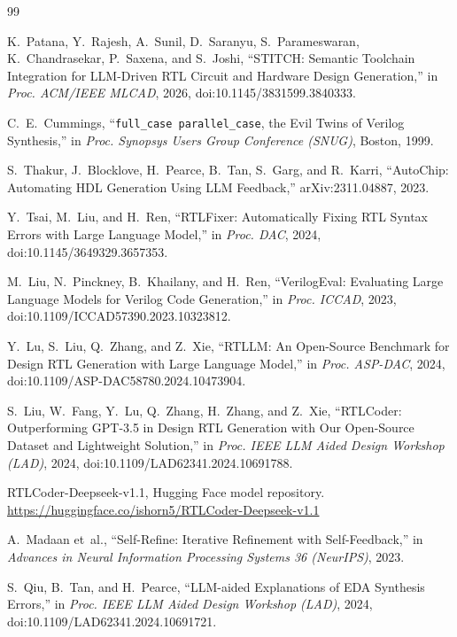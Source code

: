 \documentclass[11pt]{article}
\begin{document}
\begin{thebibliography}{99}
\footnotesize
\setlength{\itemsep}{0pt}

K.~Patana, Y.~Rajesh, A.~Sunil, D.~Saranyu, S.~Parameswaran, K.~Chandrasekar,
P.~Saxena, and S.~Joshi, ``STITCH: Semantic Toolchain Integration for
LLM-Driven RTL Circuit and Hardware Design Generation,'' in \emph{Proc. ACM/IEEE
MLCAD}, 2026, doi:10.1145/3831599.3840333.

C.~E.~Cummings, ``\texttt{full\_case parallel\_case}, the Evil Twins of Verilog
Synthesis,'' in \emph{Proc. Synopsys Users Group Conference (SNUG)}, Boston,
1999.

S.~Thakur, J.~Blocklove, H.~Pearce, B.~Tan, S.~Garg, and R.~Karri, ``AutoChip:
Automating HDL Generation Using LLM Feedback,'' arXiv:2311.04887, 2023.

Y.~Tsai, M.~Liu, and H.~Ren, ``RTLFixer: Automatically Fixing RTL Syntax Errors
with Large Language Model,'' in \emph{Proc. DAC}, 2024,
doi:10.1145/3649329.3657353.

M.~Liu, N.~Pinckney, B.~Khailany, and H.~Ren, ``VerilogEval: Evaluating Large
Language Models for Verilog Code Generation,'' in \emph{Proc. ICCAD}, 2023,
doi:10.1109/ICCAD57390.2023.10323812.

Y.~Lu, S.~Liu, Q.~Zhang, and Z.~Xie, ``RTLLM: An Open-Source Benchmark for
Design RTL Generation with Large Language Model,'' in \emph{Proc. ASP-DAC},
2024, doi:10.1109/ASP-DAC58780.2024.10473904.

S.~Liu, W.~Fang, Y.~Lu, Q.~Zhang, H.~Zhang, and Z.~Xie, ``RTLCoder:
Outperforming GPT-3.5 in Design RTL Generation with Our Open-Source Dataset and
Lightweight Solution,'' in \emph{Proc. IEEE LLM Aided Design Workshop (LAD)},
2024, doi:10.1109/LAD62341.2024.10691788.

RTLCoder-Deepseek-v1.1, Hugging Face model repository.
\url{https://huggingface.co/ishorn5/RTLCoder-Deepseek-v1.1}

A.~Madaan et~al., ``Self-Refine: Iterative Refinement with Self-Feedback,'' in
\emph{Advances in Neural Information Processing Systems 36 (NeurIPS)}, 2023.

S.~Qiu, B.~Tan, and H.~Pearce, ``LLM-aided Explanations of EDA Synthesis
Errors,'' in \emph{Proc. IEEE LLM Aided Design Workshop (LAD)}, 2024,
doi:10.1109/LAD62341.2024.10691721.


\end{thebibliography}
\end{document}
